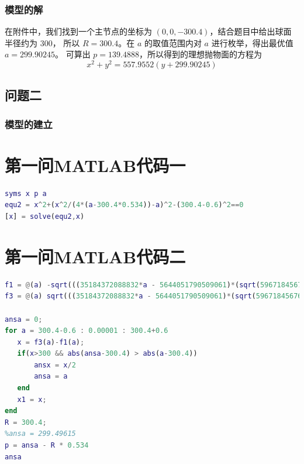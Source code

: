 \documentclass[withoutpreface,bwprint]{cumcmthesis} %
\begin{document}
\subsubsection{模型的解}
在附件中，我们找到一个主节点的坐标为 $(0,0,-300.4)$，结合题目中给出球面半径约为 $300$，
所以 $R = 300.4$。在 $a$ 的取值范围内对 $a$ 进行枚举，得出最优值 $a = 299.90245$。
可算出 $p = 139.4888$，所以得到的理想抛物面的方程为
\[
    x^2 + y^2 = 557.9552(y + 299.90245)
\]
\subsection{问题二}
\subsubsection{模型的建立}

\nocite{宋叶志2019}

\begin{appendices}
\section{第一问MATLAB代码一}
\begin{lstlisting}[language=matlab]
syms x p a
equ2 = x^2+(x^2/(4*(a-300.4*0.534))-a)^2-(300.4-0.6)^2==0
[x] = solve(equ2,x)
\end{lstlisting}
\section{第一问MATLAB代码二}
\begin{lstlisting}[language=matlab]
f1 = @(a) -sqrt(((35184372088832*a - 5644051790509061)*(sqrt(59671845676091418542400129992729 - 198582418285909280249192906752*a) - 17592186044416*a + 5644051790509061))/154742504910672534362390528);
f3 = @(a) sqrt(((35184372088832*a - 5644051790509061)*(sqrt(59671845676091418542400129992729 - 198582418285909280249192906752*a) - 17592186044416*a + 5644051790509061))/154742504910672534362390528);

ansa = 0;
for a = 300.4-0.6 : 0.00001 : 300.4+0.6
   x = f3(a)-f1(a);
   if(x>300 && abs(ansa-300.4) > abs(a-300.4))
       ansx = x/2
       ansa = a
   end
   x1 = x;
end
R = 300.4;
%ansa = 299.49615
p = ansa - R * 0.534
ansa
\end{lstlisting}
\end{appendices}
\end{document}
